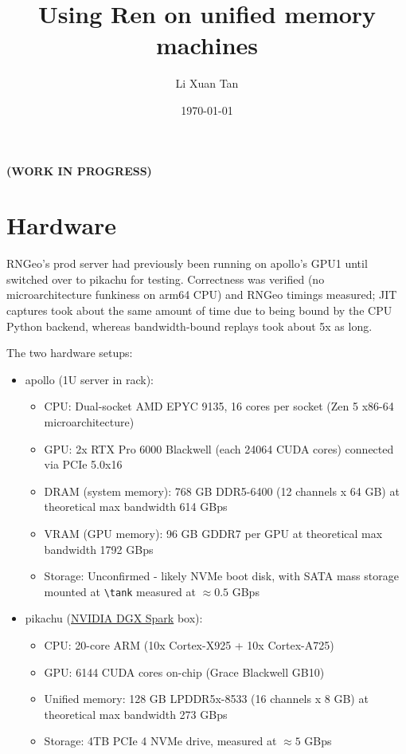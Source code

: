 \documentclass{article}
\title{Using Ren on unified memory machines}
\author{Li Xuan Tan}
\date{\today}
\begin{document}
\maketitle

\textbf{(WORK IN PROGRESS)}

\section{Hardware}
RNGeo's prod server had previously been running on apollo's GPU1 until switched over to pikachu for testing.
Correctness was verified (no microarchitecture funkiness on arm64 CPU) and RNGeo timings measured; JIT captures took about the same amount of time due to being bound by the CPU Python backend, whereas bandwidth-bound replays took about 5x as long.

The two hardware setups:
\begin{itemize}
    \item apollo (1U server in rack):
        \begin{itemize}
            \item CPU: Dual-socket AMD EPYC 9135, 16 cores per socket (Zen 5 x86-64 microarchitecture)
            \item GPU: 2x RTX Pro 6000 Blackwell (each 24064 CUDA cores) connected via PCIe 5.0x16
            \item DRAM (system memory): 768 GB DDR5-6400 (12 channels x 64 GB) at theoretical max bandwidth 614 GBps
            \item VRAM (GPU memory): 96 GB GDDR7 per GPU at theoretical max bandwidth 1792 GBps
            \item Storage: Unconfirmed - likely NVMe boot disk, with SATA mass storage mounted at \verb|\tank| measured at $\approx 0.5$ GBps
        \end{itemize}
    \item pikachu (\href{https://www.nvidia.com/en-us/products/workstations/dgx-spark/}{NVIDIA DGX Spark} box):
        \begin{itemize}
            \item CPU: 20-core ARM (10x Cortex-X925 + 10x Cortex-A725)
            \item GPU: 6144 CUDA cores on-chip (Grace Blackwell GB10)
            \item Unified memory: 128 GB LPDDR5x-8533 (16 channels x 8 GB) at theoretical max bandwidth 273 GBps
            \item Storage: 4TB PCIe 4 NVMe drive, measured at $\approx 5$ GBps
        \end{itemize}
\end{itemize}
\end{document}
